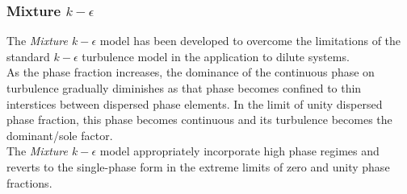 \documentclass[11pt,a4paper]{article}
\begin{document}
\subsubsection{Mixture $k-\epsilon$}
The \textit{Mixture $k-\epsilon$} model \citep{Behzadi} has been developed to overcome the limitations of the standard $k-\epsilon$ turbulence model in the application to dilute systems.\\
As the phase fraction increases, the dominance of the continuous phase on turbulence gradually diminishes as that phase becomes confined to thin interstices between dispersed phase elements. In the limit of unity dispersed phase fraction, this phase becomes continuous and its turbulence becomes the dominant/sole factor. \\
The \textit{Mixture $k-\epsilon$} model appropriately incorporate high phase regimes and reverts to the single-phase form in the extreme limits of zero and unity phase fractions.\\
\end{document}
